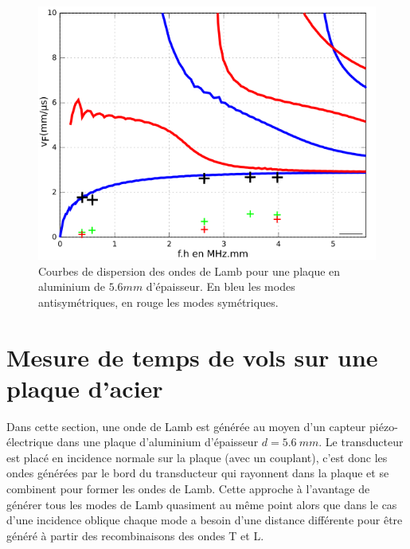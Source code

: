 \documentclass[twoside]{article}
\begin{document}
\begin{multicols}{2}
\begin{figure}[H]
\centering
\includegraphics[scale=0.5]{./images/dispercurves_aluminium.png}
\caption{\label{fig3} Courbes de dispersion des ondes de Lamb pour une plaque en aluminium de $5.6mm$ d'épaisseur. En bleu les modes antisymétriques, en rouge les modes symétriques.}
\end{figure}




\section{Mesure de temps de vols sur une plaque d'acier}
Dans cette section, une onde de Lamb est générée au moyen d'un capteur piézo-électrique dans une plaque d'aluminium d'épaisseur $d = 5.6~mm$. Le transducteur est placé en incidence normale sur la plaque (avec un couplant), c'est donc les ondes générées par le bord du transducteur qui rayonnent dans la plaque et se combinent pour former les ondes de Lamb. Cette approche à l'avantage de générer tous les modes de Lamb quasiment au même point alors que dans le cas d'une incidence oblique chaque mode a besoin d'une distance différente pour être généré à partir des recombinaisons des ondes T et L.\\ \bigskip


\end{multicols}
\end{document}
